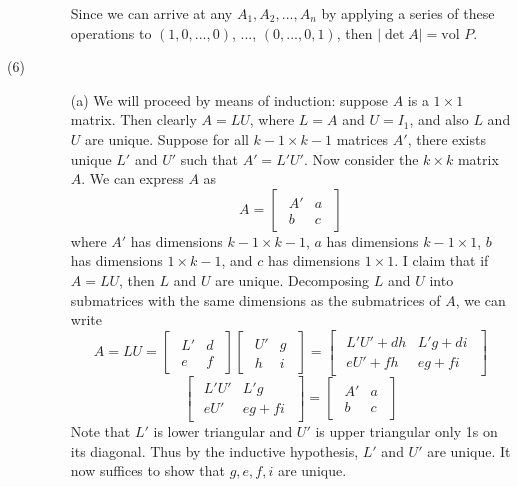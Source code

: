 \begin{description}
\begin{itemize}
Since we can arrive at any $A_1, A_2, ..., A_n$ by applying a series of these operations to $(1, 0, ..., 0)$, ..., $(0, ..., 0, 1)$, then $|\det A| = \text{vol }P$.
\end{itemize}
\item[(6)]
\begin{itemize}
\item[(a)]
We will proceed by means of induction: suppose $A$ is a $1 \times 1$ matrix. Then clearly $A = LU$, where $L = A$ and $U = I_1$, and also $L$ and $U$ are unique. Suppose for all $k - 1 \times k - 1$ matrices $A'$, there exists unique $L'$ and $U'$ such that $A' = L'U'$. Now consider the $k \times k$ matrix $A$. We can express $A$ as
$$A = \begin{bmatrix}
\begin{array}{c|c}
A' & a \\
\hline
b & c
\end{array}
\end{bmatrix}$$
where $A'$ has dimensions $k - 1 \times k - 1$, $a$ has dimensions $k - 1 \times 1$, $b$ has dimensions $1 \times k - 1$, and $c$ has dimensions $1 \times 1$. I claim that if $A = LU$, then $L$ and $U$ are unique. Decomposing $L$ and $U$ into submatrices with the same dimensions as the submatrices of $A$, we can write
$$A = LU = \begin{bmatrix}
\begin{array}{c|c}
L' & d \\
\hline
e & f
\end{array}
\end{bmatrix}\begin{bmatrix}
\begin{array}{c|c}
U' & g \\ 
\hline
h & i
\end{array}
\end{bmatrix} = \begin{bmatrix}
\begin{array}{c|c}
L'U' + dh & L'g + di \\
\hline
eU' + fh & eg + fi
\end{array}
\end{bmatrix}$$
$$\begin{bmatrix}
\begin{array}{c|c}
L'U' & L'g \\
\hline
eU' & eg + fi
\end{array}
\end{bmatrix} = \begin{bmatrix}
\begin{array}{c|c}
A' & a \\
\hline
b & c
\end{array}
\end{bmatrix}$$
Note that $L'$ is lower triangular and $U'$ is upper triangular only 1s on its diagonal. Thus by the inductive hypothesis, $L'$ and $U'$ are unique. It now suffices to show that $g, e, f, i$ are unique.


\end{itemize}
\end{description}
